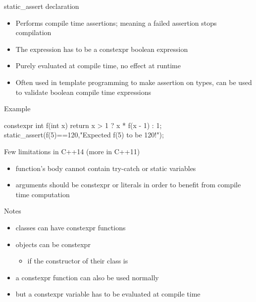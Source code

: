 \begin{frame}[fragile]
  \begin{block}{static\_assert declaration}
    \begin{itemize}
    \item Performs compile time assertions; meaning a failed assertion stops compilation
    \item The expression has to be a constexpr boolean expression
    \item Purely evaluated at compile time, no effect at runtime
    \item Often used in template programming to make assertion on types, can be
      used to validate boolean compile time expressions
    \end{itemize}
  \end{block}
  \pause
  \begin{exampleblock}{Example}
    \begin{cppcode*}{}
      constexpr int f(int x) {
        return x > 1 ? x * f(x - 1) : 1;
      }
      static_assert(f(5)==120,"Expected f(5) to be 120!");
    \end{cppcode*}
  \end{exampleblock}
\end{frame}


\begin{frame}[fragile]
   \begin{alertblock}{Few limitations in C++14 (more in C++11)}
    \begin{itemize}
    \item function's body cannot contain try-catch or static variables
    \item arguments should be constexpr or literals in order to benefit from compile time computation
    \end{itemize}
  \end{alertblock}
  \begin{block}{Notes}
    \begin{itemize}
    \item classes can have constexpr functions
    \item objects can be constexpr
      \begin{itemize}
      \item if the constructor of their class is
      \end{itemize}
    \item a constexpr function can also be used normally
    \item but a constexpr variable has to be evaluated at compile time
    \end{itemize}
  \end{block}
\end{frame}

